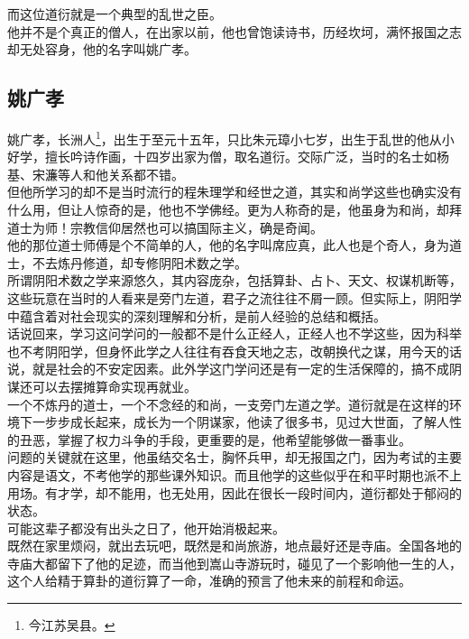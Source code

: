 \begin{multicols}{\theparacolNo}
而这位道衍就是一个典型的乱世之臣。\\

他并不是个真正的僧人，在出家以前，他也曾饱读诗书，历经坎坷，满怀报国之志却无处容身，他的名字叫姚广孝。\\

\subsection{姚广孝}
姚广孝，长洲人\footnote{今江苏吴县。}，出生于至元十五年，只比朱元璋小七岁，出生于乱世的他从小好学，擅长吟诗作画，十四岁出家为僧，取名道衍。交际广泛，当时的名士如杨基、宋濂等人和他关系都不错。\\

但他所学习的却不是当时流行的程朱理学和经世之道，其实和尚学这些也确实没有什么用，但让人惊奇的是，他也不学佛经。更为人称奇的是，他虽身为和尚，却拜道士为师！宗教信仰居然也可以搞国际主义，确是奇闻。\\

他的那位道士师傅是个不简单的人，他的名字叫席应真，此人也是个奇人，身为道士，不去炼丹修道，却专修阴阳术数之学。\\

所谓阴阳术数之学来源悠久，其内容庞杂，包括算卦、占卜、天文、权谋机断等，这些玩意在当时的人看来是旁门左道，君子之流往往不屑一顾。但实际上，阴阳学中蕴含着对社会现实的深刻理解和分析，是前人经验的总结和概括。\\

话说回来，学习这问学问的一般都不是什么正经人，正经人也不学这些，因为科举也不考阴阳学，但身怀此学之人往往有吞食天地之志，改朝换代之谋，用今天的话说，就是社会的不安定因素。此外学这门学问还是有一定的生活保障的，搞不成阴谋还可以去摆摊算命实现再就业。\\

一个不炼丹的道士，一个不念经的和尚，一支旁门左道之学。道衍就是在这样的环境下一步步成长起来，成长为一个阴谋家，他读了很多书，见过大世面，了解人性的丑恶，掌握了权力斗争的手段，更重要的是，他希望能够做一番事业。\\

问题的关键就在这里，他虽结交名士，胸怀兵甲，却无报国之门，因为考试的主要内容是语文，不考他学的那些课外知识。而且他学的这些似乎在和平时期也派不上用场。有才学，却不能用，也无处用，因此在很长一段时间内，道衍都处于郁闷的状态。\\

可能这辈子都没有出头之日了，他开始消极起来。\\

既然在家里烦闷，就出去玩吧，既然是和尚旅游，地点最好还是寺庙。全国各地的寺庙大都留下了他的足迹，而当他到嵩山寺游玩时，碰见了一个影响他一生的人，这个人给精于算卦的道衍算了一命，准确的预言了他未来的前程和命运。\\


\end{multicols}
